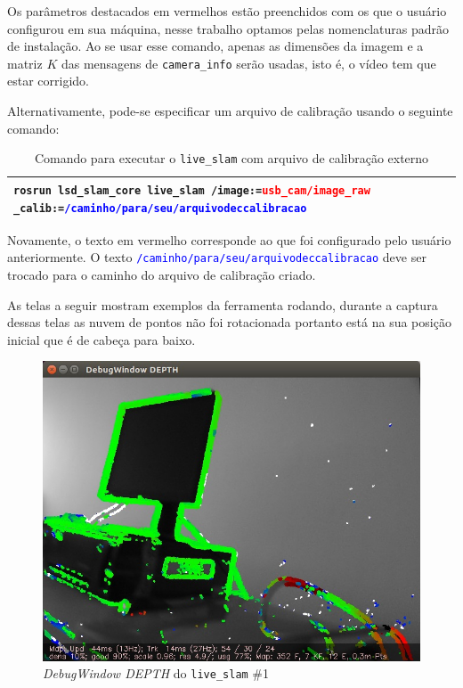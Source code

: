 Os parâmetros destacados em vermelhos estão preenchidos com os que o usuário configurou em sua máquina, nesse trabalho optamos pelas nomenclaturas padrão de instalação. Ao se usar esse comando, apenas as dimensões da imagem e a matriz $K$ das mensagens de \texttt{camera\_info} serão usadas, isto é, o vídeo tem que estar corrigido.

Alternativamente, pode-se especificar um arquivo de calibração usando o seguinte comando:

\begin{table}[H]\label{tb:15}
\begin{tabular}{| p{\textwidth}|}
\hline
\texttt{rosrun lsd\_slam\_core live\_slam /image:=\textcolor{red}{usb\_cam/image\_raw} \_calib:=\textcolor{blue}{/caminho/para/seu/arquivodeccalibracao}}\\
\hline
\end{tabular}
\caption{Comando para executar o \texttt{live\_slam} com arquivo de calibração externo}
\end{table}

Novamente, o texto em vermelho corresponde ao que foi configurado pelo usuário anteriormente. O texto \texttt{\textcolor{blue}{/caminho/para/seu/arquivodeccalibracao}} deve ser trocado para o caminho do arquivo de calibração criado.

As telas a seguir mostram exemplos da ferramenta rodando, durante a captura dessas telas as nuvem de pontos não foi rotacionada portanto está na sua posição inicial que é de cabeça para baixo. 

\begin{figure}[H]
	\centering
		\includegraphics[width= \textwidth]{Imagens/figura3-20.jpg}
	\caption{\textit{DebugWindow DEPTH} do \texttt{live\_slam} \#1}
	\label{fig3:20}
\end{figure}

